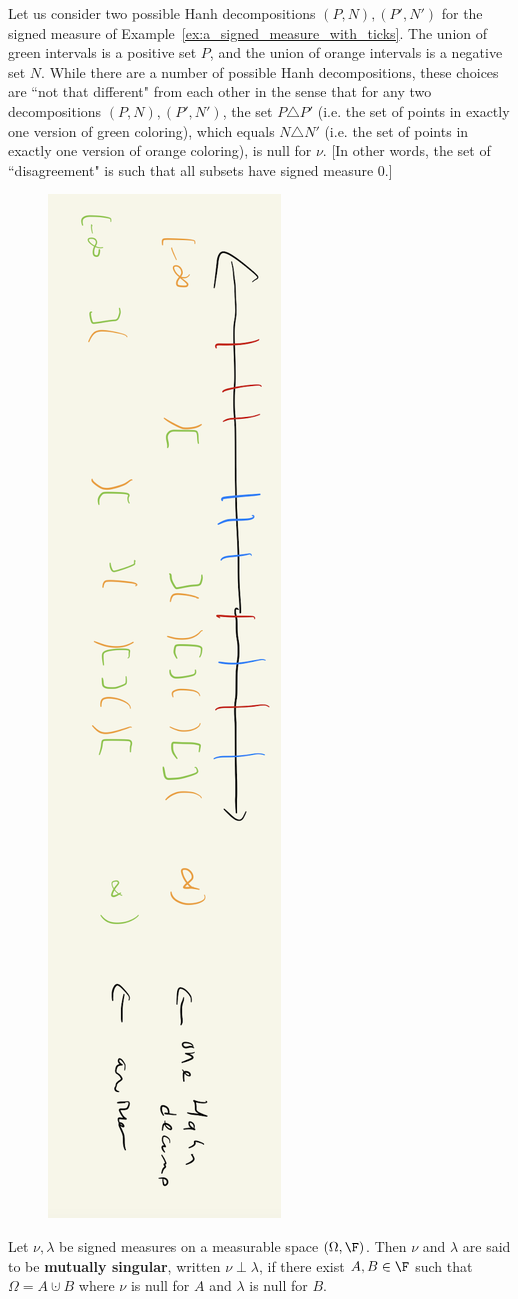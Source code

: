 \documentclass{article} %
\begin{document}
\begin{example}
Let us consider two possible Hanh decompositions $(P,N), (P',N')$ for the signed measure of Example~\ref{ex:a_signed_measure_with_ticks}. The union of green intervals is a positive set $P$, and the union of orange intervals is a negative set $N$.  While there are a number of possible Hanh decompositions, these choices are ``not that different" from each other in the sense that for any two decompositions $(P,N), (P',N')$, the set $P \triangle P'$ (i.e. the set of points in exactly one version of green coloring), which equals $N \triangle N'$ (i.e. the set of points in exactly one version of orange coloring), is null for $\nu$. [In other words, the set of ``disagreement" is such that all subsets have signed measure 0.]  
\begin{figure}[H]
\centering 
\includegraphics[width=.2\linewidth, angle=90]{images/hanh_decomposition_for_the_signed_measure_example_with_ticks}
\end{figure}
\label{ex:hanh_decomposition_for_the_signed_measure_example_with_ticks}
\end{example}


\begin{definition}
Let $\nu, \lambda$ be signed measures on a measurable space $(\Omega, \F)$.   Then $\nu$ and $\lambda$ are said to be \textbf{mutually singular}, written $\nu \perp \lambda$, if there exist $A,B \in \F$ such that $\Omega = A \cupdot B$ where $\nu$ is null for $A$ and $\lambda$ is null for $B$.
\label{def:mutually_singular}  
\end{definition}
\end{document}
